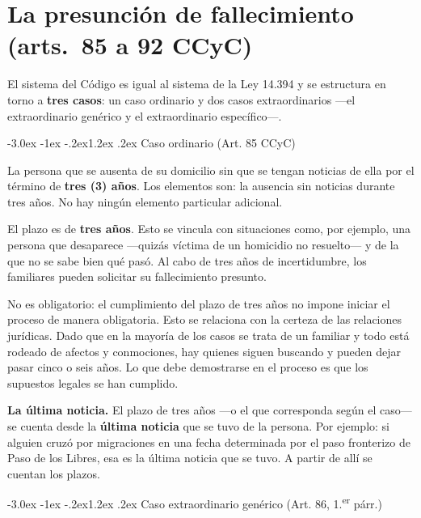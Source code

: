 \documentclass[12pt,oneside]{book}
\makeatletter
\renewcommand\section{\@startsection{section}{1}{\z@}%
  {-3.0ex \@plus -1ex \@minus -.2ex}{1.2ex \@plus .2ex}%
  {\normalfont\large\bfseries\color{acento}}}
\makeatother
\begin{document}
\chapter{La presunción de fallecimiento (arts.~85 a 92 CCyC)}
El sistema del Código es igual al sistema de la Ley 14.394 y se estructura
en torno a \textbf{tres casos}: un caso ordinario y dos casos
extraordinarios ---el extraordinario genérico y el extraordinario
específico---.

\section{Caso ordinario (Art. 85 CCyC)}

\begin{regla}
La persona que se ausenta de su domicilio sin que se tengan noticias de
ella por el término de \textbf{tres (3) años}. Los elementos son: la
ausencia sin noticias durante tres años. No hay ningún elemento
particular adicional.
\end{regla}

El plazo es de \textbf{tres años}. Esto se vincula con situaciones como,
por ejemplo, una persona que desaparece ---quizás víctima de un homicidio
no resuelto--- y de la que no se sabe bien qué pasó. Al cabo de tres años
de incertidumbre, los familiares pueden solicitar su fallecimiento
presunto.

No es obligatorio: el cumplimiento del plazo de tres años no impone
iniciar el proceso de manera obligatoria. Esto se relaciona con la
certeza de las relaciones jurídicas. Dado que en la mayoría de los casos
se trata de un familiar y todo está rodeado de afectos y conmociones, hay
quienes siguen buscando y pueden dejar pasar cinco o seis años. Lo que
debe demostrarse en el proceso es que los supuestos legales se han
cumplido.

\begin{importante}
\textbf{La última noticia.} El plazo de tres años ---o el que corresponda
según el caso--- se cuenta desde la \textbf{última noticia} que se tuvo de
la persona. Por ejemplo: si alguien cruzó por migraciones en una fecha
determinada por el paso fronterizo de Paso de los Libres, esa es la
última noticia que se tuvo. A partir de allí se cuentan los plazos.
\end{importante}

\section{Caso extraordinario genérico (Art. 86, 1.\textsuperscript{er} párr.)}
\end{document}
